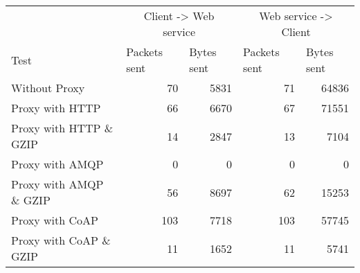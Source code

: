 \begin{tabular}{lrrrr}
\hline
\multicolumn{1}{l}{}                  & \multicolumn{2}{c}{Client -> Web service}                           & \multicolumn{2}{c}{Web service -> Client}                           \\
\multicolumn{1}{l}{Test} & \multicolumn{1}{l}{Packets sent} & \multicolumn{1}{l}{Bytes sent} & \multicolumn{1}{l}{Packets sent} & \multicolumn{1}{l}{Bytes sent} \\ \hline
Without Proxy                   & 70             & 5831           & 71             & 64836          \\
Proxy with HTTP                 & 66             & 6670           & 67             & 71551          \\
Proxy with HTTP \& GZIP         & 14             & 2847           & 13             & 7104           \\
Proxy with AMQP                 & 0              & 0              & 0              & 0              \\
Proxy with AMQP \& GZIP         & 56             & 8697           & 62             & 15253          \\
Proxy with CoAP                 & 103            & 7718           & 103            & 57745          \\
Proxy with CoAP \& GZIP         & 11             & 1652           & 11             & 5741           \\
\end{tabular}